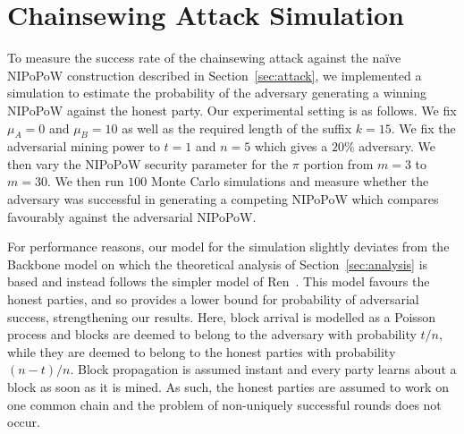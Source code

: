 \section{Chainsewing Attack Simulation}
\label{sec:simulation}

To measure the success rate of the chainsewing attack against the na\"ive NIPoPoW construction described in Section~\ref{sec:attack}, we implemented a simulation to estimate the probability of the adversary generating a winning NIPoPoW against the honest party. Our experimental setting is as follows. We fix $\mu_A = 0$ and $\mu_B = 10$ as well as the required length of the suffix $k = 15$. We fix the adversarial mining power to $t = 1$ and $n = 5$ which gives a $20\%$ adversary. We then vary the NIPoPoW security parameter for the $\pi$ portion from $m = 3$ to $m = 30$. We then run $100$ Monte Carlo simulations and measure whether the adversary was successful in generating a competing NIPoPoW which compares favourably against the adversarial NIPoPoW.

For performance reasons, our model for the simulation slightly deviates from the Backbone model on which the theoretical analysis of Section~\ref{sec:analysis} is based and instead follows the simpler model of Ren~\cite{nakamoto-simple}. This model favours the honest parties, and so provides a lower bound for probability of adversarial success, strengthening our results. Here, block arrival is modelled as a Poisson process and blocks are deemed to belong to the adversary with probability $t / n$, while they are deemed to belong to the honest parties with probability $(n - t) / n$. Block propagation is assumed instant and every party learns about a block as soon as it is mined. As such, the honest parties are assumed to work on one common chain and the problem of non-uniquely successful rounds does not occur.

